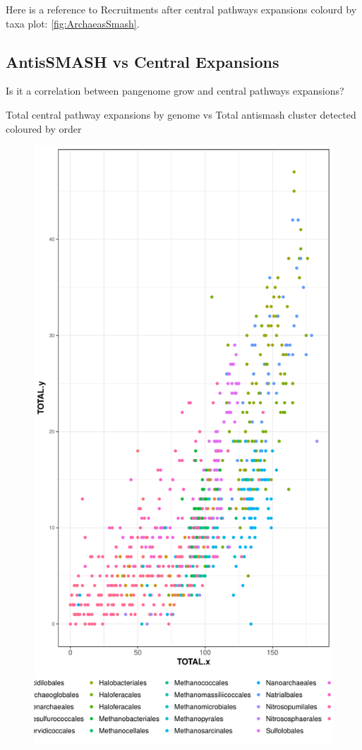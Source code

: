 \documentclass[12pt,twoside]{reedthesis}
\begin{document}
  Here is a reference to Recruitments after central pathways expansions
  colourd by taxa plot: \autoref{fig:ArchaeasSmash}. \clearpage
  
  \subsection{AntisSMASH vs Central
  Expansions}\label{antissmash-vs-central-expansions}
  
  Is it a correlation between pangenome grow and central pathways
  expansions?
  
  Total central pathway expansions by genome vs Total antismash cluster
  detected coloured by order
  
  \begin{figure}[h!tbp]
  \centering
  \includegraphics[angle = 0,scale = 0.5]{chapter3/ArchaeasSMASHvsExpansionsbyOrder.pdf}

\end{figure}
\end{document}
